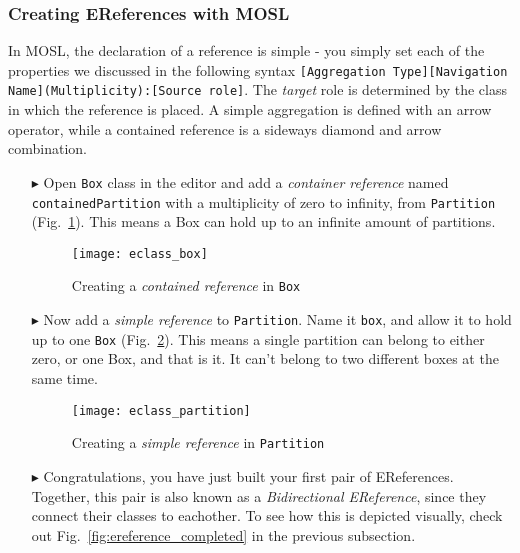 \newpage
\subsubsection{Creating EReferences with MOSL}
\texHeader
\hypertarget{static:references tex}{}

In MOSL, the declaration of a reference is simple - you simply set each of the properties we discussed in the following syntax {\small{\texttt{[Aggregation
Type][Navigation Name](Multiplicity):[Source role]}}}. The \emph{target} role is determined by the class in which the reference is placed. A simple aggregation
is defined with an arrow operator, while a contained reference is a sideways diamond and arrow combination.

\begin{itemize}

\item[$\blacktriangleright$] Open \texttt{Box} class in the editor and add a \emph{container reference} named \texttt{containedPartition} with a multiplicity of zero
to infinity, from \texttt{Partition} (Fig.~\ref{fig:cpartitionReference}). This means a Box can hold up to an infinite amount of partitions.

\begin{figure}[htbp]
	\centering
  \texttt{[image: eclass\_box]}
	\caption{Creating a \emph{contained reference} in \texttt{Box}}
	\label{fig:cpartitionReference}
\end{figure} 

\item[$\blacktriangleright$] Now add a \emph{simple reference} to \texttt{Partition}. Name it \texttt{box}, and allow it to hold up to one \texttt{Box}
(Fig.~\ref{fig:boxReference}). This means a single partition can belong to either zero, or one Box, and that is it. It can't belong to two different boxes at
the same time.

\begin{figure}[htbp]
	\centering
  \texttt{[image: eclass\_partition]}
	\caption{Creating a \emph{simple reference} in \texttt{Partition}}
	\label{fig:boxReference}
\end{figure} 

\item[$\blacktriangleright$] Congratulations, you have just built your first pair of EReferences. Together, this pair is also known as a \emph{Bidirectional
EReference}, since they connect their classes to eachother. To see how this is depicted visually, check out Fig.~\ref{fig:ereference_completed} in the previous
subsection.


\end{itemize}
